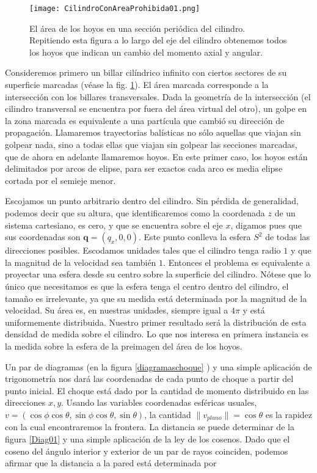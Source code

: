 \documentclass[letterpaper,12pt]{article}
\newcommand{\qfase}{\mathbf{q}}
\begin{document}
\begin{figure}
  \centering
  \texttt{[image: CilindroConAreaProhibida01.png]}
  \caption{El área de los hoyos en una sección periódica del cilindro.
    Repitiendo esta figura a lo largo del eje del cilindro obtenemos
    todos los hoyos que indican un cambio del momento axial y angular.}
  \label{huecos01}
\end{figure}


Consideremos primero un billar cilíndrico infinito con ciertos
sectores de su superficie marcadas (véase la fig. \ref{huecos01}). 
El área marcada corresponde
a la intersección con los billares transversales. Dada la geometría
de la intersección (el cilindro transversal se encuentra por fuera del 
área virtual del otro), un golpe en la zona marcada es equivalente
a una partícula que cambió su dirección de propagación. 
Llamaremos trayectorias balísticas no sólo aquellas que viajan sin golpear nada,
sino a todas ellas que viajan sin golpear las secciones marcadas, que de
ahora en adelante llamaremos hoyos. En este primer caso, los hoyos están
delimitados por arcos de elipse, para ser exactos cada arco es media
elipse cortada por el semieje menor. 

Escojamos un punto arbitrario dentro del cilindro.
Sin pérdida de generalidad, podemos decir que su altura, que identificaremos
como la coordenada $z$ de un sistema cartesiano, es cero, y 
que se encuentra sobre el eje $x$, digamos pues que sus coordenadas
son $\qfase=(q_x,0,0)$. Este punto conlleva la esfera $S^2$ de todas las direcciones
posibles. Escodamos unidades tales que el cilindro tenga radio $1$ y
que la magnitud de la velocidad sea también $1$. 
Entonces el problema es equivalente a proyectar una esfera desde su centro
 sobre la superficie del cilindro. Nótese que lo único que necesitamos
es que la esfera tenga el centro dentro del cilindro, el tamaño es irrelevante,
ya que su medida está determinada por la magnitud de la velocidad. Su
área es, en nuestras unidades, siempre igual a $4\pi$ y está uniformemente
distribuida. Nuestro primer resultado será la distribución de esta densidad
de medida sobre el cilindro. Lo que nos interesa en primera instancia
es la medida sobre la esfera de la preimagen del área de los hoyos.

Un par de diagramas (en la figura \ref{diagramaschoque} )
y una simple aplicación de trigonometría nos dará
las coordenadas de cada punto de choque a partir del punto inicial.
El choque está dado por la cantidad de momento distribuido en
las direcciones $x,y$. Usando las variables coordenadas
esféricas usuales, 
$v=(\cos \phi \cos\theta, \sin \phi \cos\theta, \sin \theta)$,
 la cantidad $\|v_{plano}\|= \cos \theta$ es la rapidez 
con la cual encontraremos la frontera. La distancia se puede determinar
de la figura \ref{Diag01} y una simple aplicación
de la ley de los cosenos. Dado que el coseno del ángulo interior
y exterior de un par de rayos coinciden, podemos afirmar que la 
distancia a la pared está determinada por
\end{document}
